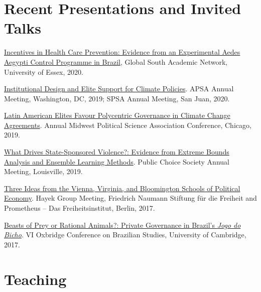 \documentclass[a4paper]{article}
\renewenvironment{itemize}{
	\begin{list}{}{
			\setlength{\leftmargin}{1.5em}
		}
		}{
	\end{list}
}
\begin{document}
\section*{Recent Presentations and Invited Talks}

\begin{itemize}
\item \href{https://danilofreire.github.io/essex2020/aedes.html}{Incentives in Health Care Prevention:
Evidence from an Experimental Aedes Aegypti Control Programme in Brazil}, Global South Academic Network, University of Essex, 2020.
\item \href{https://osf.io/9a6ch}{Institutional Design and Elite Support for Climate Policies}. APSA Annual Meeting, Washington, DC, 2019; SPSA Annual Meeting, San Juan, 2020.
\item \href{https://osf.io/9a6ch}{Latin American Elites Favour Polycentric Governance in Climate Change Agreements}. Annual Midwest Political Science Association Conference, Chicago, 2019.
\item \href{http://danilofreire.github.io/pcs-2019}{What Drives State-Sponsored Violence?: Evidence from Extreme Bounds Analysis and Ensemble Learning Methods}. Public Choice Society Annual Meeting, Louisville, 2019.
\item \href{https://www.overleaf.com/project/591ef5259fb58ede3dc4d369}{Three Ideas from the Vienna, Virginia, and Bloomington Schools of Political Economy}. Hayek Group Meeting, Friedrich Naumann Stiftung f{\"u}r die Freiheit and Prometheus -- Das Freiheitsinstitut, Berlin, 2017.
\item \href{https://osf.io/se2jr}{Beasts of Prey or Rational Animals?: Private Governance in Brazil's \emph{Jogo do Bicho}}. VI Oxbridge Conference on Brazilian Studies, University of Cambridge, 2017.
\end{itemize}

\section*{Teaching}
\end{document}
